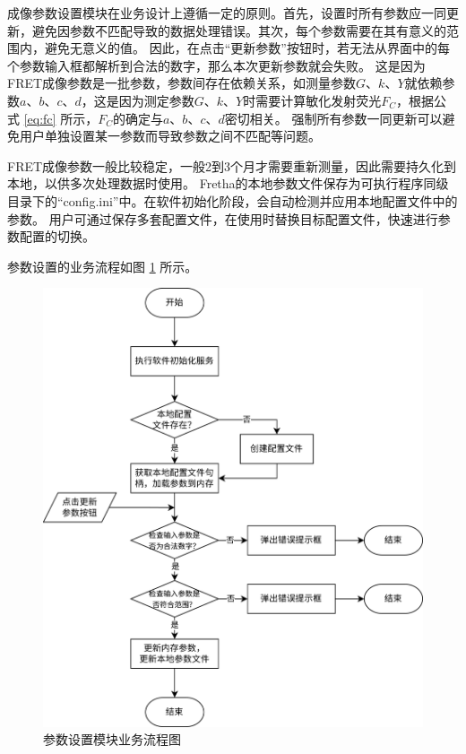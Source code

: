 成像参数设置模块在业务设计上遵循一定的原则。首先，设置时所有参数应一同更新，避免因参数不匹配导致的数据处理错误。其次，每个参数需要在其有意义的范围内，避免无意义的值。
因此，在点击“更新参数”按钮时，若无法从界面中的每个参数输入框都解析到合法的数字，那么本次更新参数就会失败。
这是因为FRET成像参数是一批参数，参数间存在依赖关系，如测量参数$G$、$k$、$Y$就依赖参数$a$、$b$、$c$、$d$，这是因为测定参数$G$、$k$、$Y$时需要计算敏化发射荧光$F_C$，根据公式 \ref{eq:fc} 所示，$F_C$的确定与$a$、$b$、$c$、$d$密切相关。
强制所有参数一同更新可以避免用户单独设置某一参数而导致参数之间不匹配等问题。

FRET成像参数一般比较稳定，一般2到3个月才需要重新测量，因此需要持久化到本地，以供多次处理数据时使用。
Fretha的本地参数文件保存为可执行程序同级目录下的“config.ini”中。在软件初始化阶段，会自动检测并应用本地配置文件中的参数。
用户可通过保存多套配置文件，在使用时替换目标配置文件，快速进行参数配置的切换。

参数设置的业务流程如图 \ref{fig:fretha_param_module_flow} 所示。

\begin{figure}[hbtp]
    \centering
    \includegraphics[height=1\linewidth]{../figures/2/2_成像参数设置模块业务流程.drawio.png}
    \caption{参数设置模块业务流程图}
    \label{fig:fretha_param_module_flow}
\end{figure}
\fi

